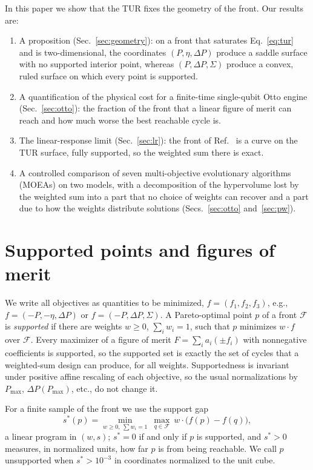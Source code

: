 \documentclass[pre,twocolumn,superscriptaddress,nofootinbib,longbibliography]{revtex4-2}
\newcommand{\Pmax}{P_{\max}}
\begin{document}
In this paper we show that the TUR fixes the geometry of the front. Our results are:
\begin{enumerate}
\item A proposition (Sec.~\ref{sec:geometry}): on a front that saturates Eq.~\eqref{eq:tur} and is
two-dimensional, the coordinates $(P,\eta,\Delta P)$ produce a saddle surface with no supported
interior point, whereas $(P,\Delta P,\Sigma)$ produce a convex, ruled surface on which every point is
supported.
\item A quantification of the physical cost for a finite-time single-qubit Otto engine
(Sec.~\ref{sec:otto}): the fraction of the front that a linear figure of merit can reach and how
much worse the best reachable cycle is.
\item The linear-response limit (Sec.~\ref{sec:lr}): the front of Ref.~\cite{Almanza2026} is a
curve on the TUR surface, fully supported, so the weighted sum there is exact.
\item A controlled comparison of seven multi-objective evolutionary algorithms (MOEAs) on two
models, with a decomposition of the hypervolume lost by the weighted sum into a part that no choice
of weights can recover and a part due to how the weights distribute solutions
(Secs.~\ref{sec:otto} and~\ref{sec:pw}).
\end{enumerate}

\section{Supported points and figures of merit}
\label{sec:supported}

We write all objectives as quantities to be minimized, $f = (f_1, f_2, f_3)$, e.g.,
$f = (-P, -\eta, \Delta P)$ or $f = (-P, \Delta P, \Sigma)$. A Pareto-optimal point $p$ of a front
$\mathcal{F}$ is \emph{supported} if there are weights $w \ge 0$, $\sum_i w_i = 1$, such that $p$
minimizes $w\cdot f$ over $\mathcal{F}$. Every maximizer of a figure of merit
$F = \sum_i a_i (\pm f_i)$ with nonnegative coefficients is supported, so the supported set is
exactly the set of cycles that a weighted-sum design can produce, for all weights. Supportedness
is invariant under positive affine rescaling of each objective, so the usual normalizations by
$\Pmax$, $\Delta P(\Pmax)$, etc., do not change it.

For a finite sample of the front we use the support gap~\cite{Ehrgott2005}
\begin{equation}
s^*(p) = \min_{w \ge 0,\ \sum w_i = 1}\ \max_{q \in \mathcal{F}}\ w\cdot\bigl(f(p) - f(q)\bigr),
\label{eq:gap}
\end{equation}
a linear program in $(w, s)$; $s^* = 0$ if and only if $p$ is supported, and $s^*>0$ measures, in
normalized units, how far $p$ is from being reachable. We call $p$ unsupported when
$s^* > 10^{-3}$ in coordinates normalized to the unit cube.
\end{document}
